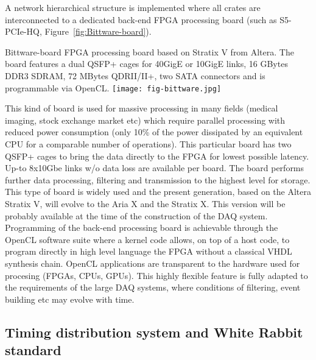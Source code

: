 A network hierarchical structure is implemented where all crates are
interconnected to a dedicated back-end FPGA processing board (such as
S5-PCIe-HQ, Figure~\ref{fig:Bittware-board}). 
\begin{cdrfigure}{Bittware-board}
{\small FPGA processing board based on Stratix V from Altera. The board 
features a dual QSFP+ cages for 40GigE or 10GigE links, 16 GBytes DDR3 SDRAM, 
72 MBytes QDRII/II+, two SATA connectors and is programmable via OpenCL.}
\texttt{[image: fig-bittware.jpg]}
\end{cdrfigure}
This kind of board is used for massive processing in many fields
(medical imaging, stock exchange market etc) which require parallel
processing with reduced power consumption (only 10\% of the power
dissipated by an equivalent CPU for a comparable number of
operations). This particular board has two QSFP+ cages to bring the
data directly to the FPGA for lowest possible latency. Up-to 8x10Gbe
links w/o data loss are available per board.  The board performs
further data processing, filtering and transmission to the highest
level for storage. This type of board is widely used and the present
generation, based on the Altera Stratix V, will evolve to the Aria X
and the Stratix X. This version will be probably available at the time
of the construction of the DAQ system. Programming of the back-end
processing board is achievable through the OpenCL software suite where
a kernel code allows, on top of a host code, to program directly in
high level language the FPGA without a classical VHDL synthesis
chain. OpenCL applications are transparent to the hardware used for
procesing (FPGAs, CPUs, GPUs). This highly flexible feature is fully
adapted to the requirements of the large DAQ systems, where conditions
of filtering, event building etc may evolve with time.
 
\subsection{Timing distribution system and White Rabbit standard}

